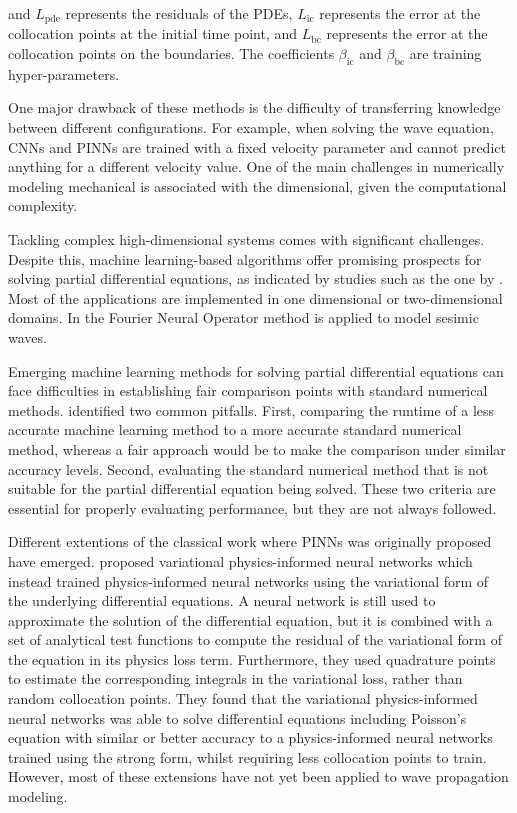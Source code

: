 \documentclass[11pt,twoside]{article}
\begin{document}
and \( L_{\text{pde}} \) represents the residuals of the PDEs, \( L_{\text{ic}} \) represents the error at the collocation points at the 
initial time point, and \( L_{\text{bc}} \) represents the error at the collocation points on the boundaries. The coefficients 
\(\beta_{\text{ic}}\) and \(\beta_{\text{bc}}\) are training hyper-parameters.

One major drawback of these methods is the difficulty of transferring knowledge between different configurations. For example, when solving 
the wave equation, CNNs and PINNs are trained with a fixed velocity parameter and cannot predict anything for a different velocity value. 
One of the main challenges in numerically modeling mechanical is associated with the dimensional, given the computational complexity.

Tackling complex high-dimensional systems comes with significant challenges. Despite this, machine learning-based algorithms offer promising 
prospects for solving partial differential equations, as indicated by studies such as the one by . 
Most of the applications are implemented in one dimensional or two-dimensional domains. In  the Fourier 
Neural Operator method is applied to model sesimic waves.

Emerging machine learning methods for solving partial differential equations can face difficulties in establishing fair comparison points 
with standard numerical methods. \citeauthor{mcgreivy_weak_2024} identified two common pitfalls. First, comparing the runtime of a less 
accurate machine learning method to a more accurate standard numerical method, whereas a fair approach would be to make the comparison under 
similar accuracy levels. Second, evaluating the standard numerical method that is not suitable for the partial differential equation being 
solved. These two criteria are essential for properly evaluating performance, but they are not always followed. 
 
Different extentions of the classical work where PINNs was originally proposed have emerged.  
proposed variational physics-informed neural networks which instead trained physics-informed neural networks using the variational form of the 
underlying differential equations. A neural network is still used to approximate the solution of the differential equation, but it is combined 
with a set of analytical test functions to compute the residual of the variational form of the equation in its physics loss term. Furthermore, 
they used quadrature points to estimate the corresponding integrals in the variational loss, rather than random collocation points. They found 
that the variational physics-informed neural networks was able to solve differential equations including Poisson’s equation with similar or 
better accuracy to a physics-informed neural networks trained using the strong form, whilst requiring less collocation points to train. 
However, most of these extensions have not yet been applied to wave propagation modeling.
\end{document}
